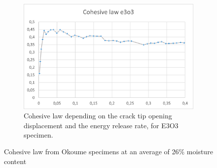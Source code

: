 \begin{figure}[H]
\begin{subfigure}{0.48\linewidth}
	\includegraphics[scale=0.6]{Figures/e3o3_colaw}
	\decoRule
	\caption[Cohesive law from E3O3 specimen]{Cohesive law depending on the crack tip opening displacement and the energy release rate, for E3O3 specimen.}
	\label{fig:E3O3_colaw}
\end{subfigure}
\caption{Cohesive law from Okoume specimens at an average of 26\% moisture content}
\label{E3o_colaw}
\end{figure}
\newpage
